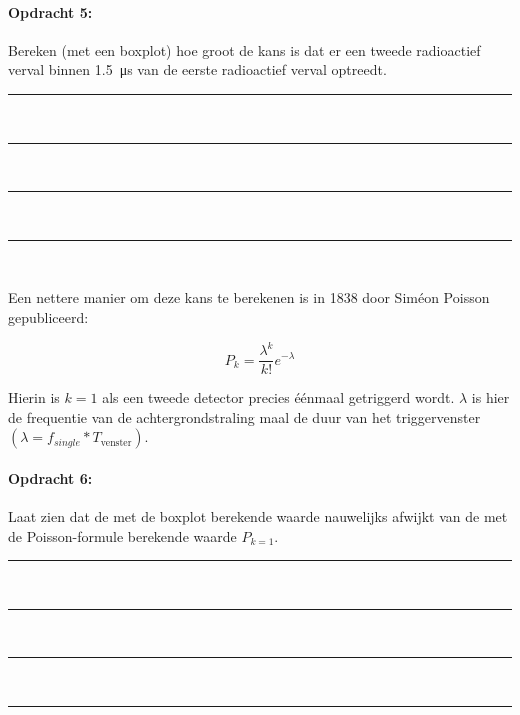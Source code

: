 \begin{minipage}[t]{1\columnwidth}%

\paragraph{Opdracht 5:}

Bereken (met een boxplot) hoe groot de kans is dat er een
tweede radioactief verval binnen \SI{1.5}{\micro\second} van de eerste
radioactief verval optreedt.

\begin{center}
    \rule{\textwidth}{0.3mm}\\
    \rule{\textwidth}{0.3mm}\\
    \rule{\textwidth}{0.3mm}\\
    \rule{\textwidth}{0.3mm}\\
\end{center}
\end{minipage}

\bigskip{}

Een nettere manier om deze kans te berekenen is in 1838 door Siméon
Poisson \cite{wiki} gepubliceerd:

\begin{equation}
    P_{k}=\frac{\lambda^{k}}{k!}e^{-\lambda}
\end{equation}

Hierin is $k=1$ als een tweede detector precies éénmaal getriggerd
wordt. $\lambda$ is hier de frequentie van de achtergrondstraling
maal de duur van het triggervenster $\left(\lambda=f_{single}*T_\textrm{venster}\right)$. 

\begin{minipage}[t]{1\columnwidth}%

\paragraph{Opdracht 6:}

Laat zien dat de met de boxplot berekende waarde nauwelijks
afwijkt van de met de Poisson-formule berekende waarde $P_{k=1}$.

\begin{center}
    \rule{\textwidth}{0.3mm}\\
    \rule{\textwidth}{0.3mm}\\
    \rule{\textwidth}{0.3mm}\\
    \rule{\textwidth}{0.3mm}\\
\end{center}
\end{minipage}

